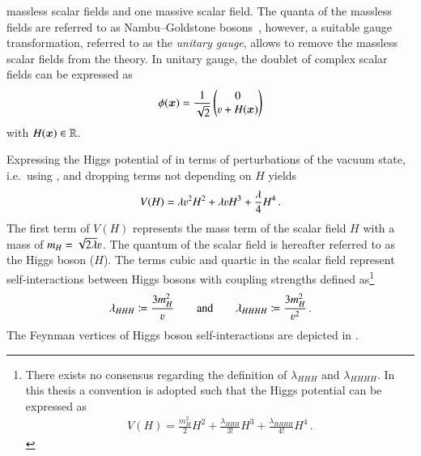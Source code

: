 massless scalar fields and one massive scalar field. The quanta of the massless
fields are referred to as Nambu--Goldstone
bosons~\cite{Nambu:1960tm,Goldstone:1961eq}, however, a suitable gauge
transformation, referred to as the \emph{unitary gauge}, allows to remove the
massless scalar fields from the theory. In unitary gauge, the doublet of complex
scalar fields can be expressed as
\begin{align}
  \phi(\myvec{x}) = \frac{1}{\sqrt{2}}
  \begin{pmatrix}
    0 \\
    \varv + H(\myvec{x})
  \end{pmatrix}
  \label{eq:vacuum_state_perturb}
\end{align}
with $H(\bm{x}) \in \mathbb{R}$.

Expressing the Higgs potential of  in terms of
perturbations of the vacuum state, i.e.\ using ,
and dropping terms not depending on $H$ yields
\begin{align}
  V(H) =
  \lambda \varv^2 H^2
  + \lambda \varv H^3
  + \frac{\lambda}{4} H^4 \,\text{.}
  \label{eq:beh_potential}
\end{align}
The first term of $V(H)$ represents the mass term of the scalar field $H$ with a
mass of $m_H = \sqrt{2\lambda} \varv$. The quantum of the scalar field is hereafter
referred to as the Higgs boson ($H$). The terms cubic and quartic in the scalar
field represent self-interactions between Higgs bosons with coupling strengths
defined as\footnote{There exists no consensus regarding the definition of
  $\lambda_{HHH}$ and $\lambda_{HHHH}$. In this thesis a convention is adopted
  such that the Higgs potential can be expressed as
  \begin{align*}
    V(H) = \frac{m_{H}^2}{2} H^2 + \frac{\lambda_{HHH}}{3!} H^3 + \frac{\lambda_{HHHH}}{4!}
    H^4 \,\text{.}
  \end{align*}
}
\begin{align*}
  \lambda_{HHH} \coloneqq \frac{3 m_{H}^2}{\varv} \qquad \text{and} \qquad \lambda_{HHHH} \coloneqq \frac{3 m_{H}^2}{\varv^2} \,\text{.}
\end{align*}
The Feynman vertices of Higgs boson self-interactions are depicted in
.

